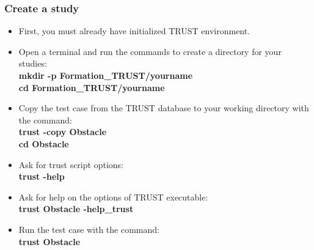 \documentclass[10pt, hyperref={unicode=true,pdfusetitle, bookmarks=true,bookmarksnumbered=false,bookmarksopen=false, breaklinks=false,pdfborder={0 0 1},backref=true,colorlinks=true,linkcolor=darkblue,pageanchor}]{beamer}
\begin{document}
\begin{frame}
\frametitle{Create a study}
\begin{block}{}

\begin{itemize}
\item First, you must already have initialized TRUST environment.
\vspace{0.2cm}

\item Open a terminal and run the commands to create a directory for your studies: \\
\textbf{mkdir -p \; Formation\_TRUST/yourname}\\
\textbf{cd \; Formation\_TRUST/yourname}
\vspace{0.2cm}

\item \label{method_copy} Copy the test case from the TRUST database to your working directory with the command:\\
\textbf{trust -copy Obstacle}\\
\textbf{cd Obstacle}
\vspace{0.2cm}

\item Ask for trust script options:\\
\textbf{trust -help}\\
\vspace{0.2cm}

\item Ask for help on the options of TRUST executable:\\
\textbf{trust Obstacle -help\_trust}\\
\vspace{0.2cm}

\item Run the test case with the command:\\
\textbf{trust Obstacle}\\

\end{itemize}

\end{block}
\end{frame}
\end{document}
